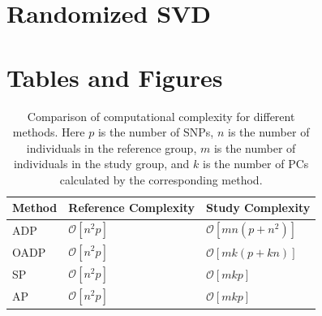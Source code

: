 \documentclass{article}
\newcommand{\bO}{\mathcal{O}}
\begin{document}
\section{Randomized SVD}\label{sec:randsvd}




\newpage





\newpage

\section{Tables and Figures}

\begin{table} 
  \centering
  \begin{tabular}{|l|l|l|}
    \hline
    Method & Reference Complexity & Study Complexity \\ 
    \hline
    ADP & $\bO[n^2 p]$ & $\bO[mn(p + n^2)]$ \\
    \hline
    OADP & $\bO[n^2 p]$ & $\bO[mk(p + k n)]$ \\
    \hline
    SP & $\bO[n^2p]$ & $\bO[mkp]$ \\
    \hline
    AP & $\bO[n^2p]$ &  $\bO[mkp]$ \\
    \hline
  \end{tabular}
  \caption{
    Comparison of computational complexity for different methods.
    Here $p$ is the number of SNPs,
    $n$ is the number of individuals in the reference group,
    $m$ is the number of individuals in the  study group,
    and $k$ is the number of PCs calculated by the corresponding method.
  }
  \label{tbl:cplx}
\end{table}
\end{document}
